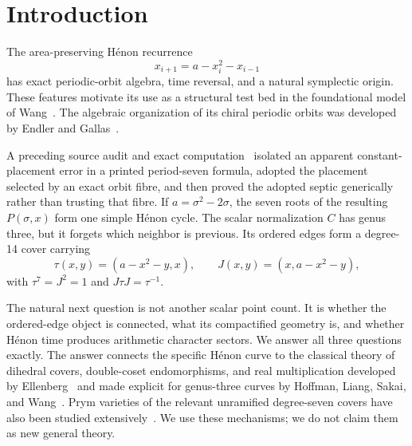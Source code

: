 \section{Introduction}

The area-preserving H\'enon recurrence
\begin{equation}\label{eq:henon}
 x_{i+1}=a-x_i^2-x_{i-1}
\end{equation}
has exact periodic-orbit algebra, time reversal, and a natural symplectic
origin.  These features motivate its use as a structural test bed in the
foundational model of Wang~\cite{wang2026henon}.  The algebraic organization
of its chiral periodic orbits was developed by Endler and
Gallas~\cite{endler2006chiral}.

A preceding source audit and exact computation~\cite{hcs19} isolated an
apparent constant-placement error in a printed period-seven formula, adopted
the placement selected by an exact orbit fibre, and then proved the adopted
septic generically rather than trusting that fibre.  If
$a=\sigma^2-2\sigma$, the seven roots of the resulting
$P(\sigma,x)$ form one simple H\'enon cycle.  The scalar normalization $C$ has
genus three, but it forgets which neighbor is previous.  Its ordered edges
form a degree-14 cover carrying
\[
 \tau(x,y)=(a-x^2-y,x),\qquad
 J(x,y)=(x,a-x^2-y),
\]
with $\tau^7=J^2=1$ and $J\tau J=\tau^{-1}$.

The natural next question is not another scalar point count.  It is whether
the ordered-edge object is connected, what its compactified geometry is, and
whether H\'enon time produces arithmetic character sectors.  We answer all
three questions exactly.  The answer connects the specific H\'enon curve to
the classical theory of dihedral covers, double-coset endomorphisms, and real
multiplication developed by Ellenberg~\cite{ellenberg2001endomorphism} and
made explicit for genus-three curves by Hoffman, Liang, Sakai, and
Wang~\cite{hoffman2016genus3}.  Prym varieties of the relevant unramified
degree-seven covers have also been studied extensively~\cite{lange2016prym}.
We use these mechanisms; we do not claim them as new general theory.

